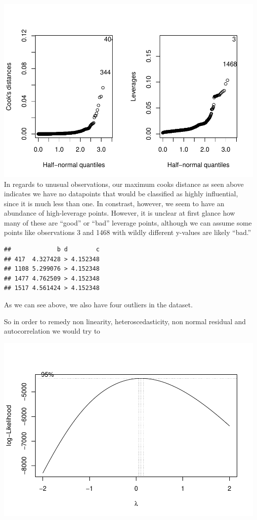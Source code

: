 \documentclass[
]{article}
\begin{document}
\includegraphics{Final_Project_2_files/figure-latex/unnamed-chunk-14-1.pdf}
In regards to unusual observations, our maximum cooks distance as seen
above indicates we have no datapoints that would be classified as highly
influential, since it is much less than one. In constrast, however, we
seem to have an abundance of high-leverage points. However, it is
unclear at first glance how many of these are ``good'' or ``bad''
leverage points, although we can assume some points like observations 3
and 1468 with wildly different y-values are likely ``bad.''

\begin{verbatim}
##             b d        c
## 417  4.327428 > 4.152348
## 1108 5.299076 > 4.152348
## 1477 4.762509 > 4.152348
## 1517 4.561424 > 4.152348
\end{verbatim}

As we can see above, we also have four outliers in the dataset.

So in order to remedy non linearity, heteroscedasticity, non normal
residual and autocorrelation we would try to

\includegraphics{Final_Project_2_files/figure-latex/unnamed-chunk-16-1.pdf}
\end{document}
